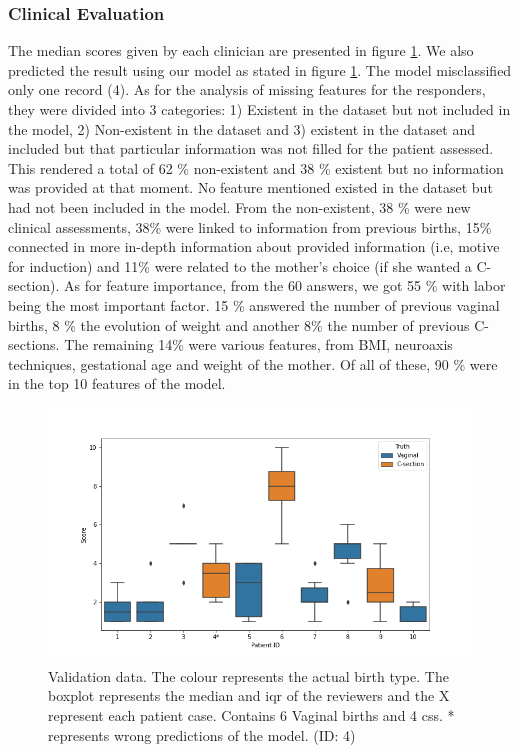 \subsubsection{Clinical Evaluation}
The median scores given by each clinician are presented in figure \ref{fig:clinical}. We also predicted the result using our model as stated in figure \ref{fig:clinical}. The model misclassified only one record (4). As for the analysis of missing features for the responders, they were divided into 3 categories: 1) Existent in the dataset but not included in the model, 2) Non-existent in the dataset and 3) existent in the dataset and included but that particular information was not filled for the patient assessed. This rendered a total of 62 \% non-existent and 38 \% existent but no information was provided at that moment. No feature mentioned existed in the dataset but had not been included in the model. From the non-existent, 38 \% were new clinical assessments, 38\% were linked to information from previous births, 15\% connected in more in-depth information about provided information (i.e, motive for induction) and 11\% were related to the mother's choice (if she wanted a C-section). As for feature importance, from the 60 answers, we got 55 \% with labor being the most important factor. 15 \% answered the number of previous vaginal births, 8 \% the evolution of weight and another 8\% the number of previous C-sections. The remaining 14\% were various features, from BMI, neuroaxis techniques, gestational age and weight of the mother. Of all of these, 90 \% were in the top 10 features of the model.




\begin{figure}[htbp]
\centering
\captionsetup{justification=centering}
\caption[Obstetrics questionnaires data]{Validation data. The colour represents the actual birth type. The boxplot represents the median and \ac{iqr} of the reviewers and the X represent each patient case. Contains 6 Vaginal births and 4 \acp{cs}. * represents wrong predictions of the model. (ID: 4)}\label{fig:clinical} 
\includegraphics[scale=0.60]{figures/clinical_assessment.png}
\end{figure}




